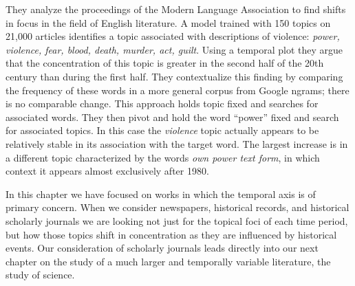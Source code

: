 They analyze the proceedings of the Modern Language Association to find shifts in focus in the field of English literature.
A model trained with 150 topics on 21,000 articles identifies a topic associated with descriptions of violence: {\em power,
violence, fear, blood, death, murder, act, guilt}. Using a temporal plot they argue that the concentration of this topic is greater in the second half of the 20th century than during the first half.
They contextualize this finding by comparing the frequency of these words in a more general corpus from Google ngrams; there is no comparable change.
This approach holds topic fixed and searches for associated words.
They then pivot and hold the word ``power'' fixed and search for associated topics.
In this case the {\em violence} topic actually appears to be relatively stable in its association with the target word. The largest increase is in a different topic characterized by the words {\em own power text form}, in which context it appears almost exclusively after 1980.

In this chapter we have focused on works in which the temporal axis is of primary concern.
When we consider newspapers, historical records, and historical scholarly journals we are looking not just for the topical foci of each time period, but how those topics shift in concentration as they are influenced by historical events.
Our consideration of scholarly journals leads directly into our next chapter on the study of a much larger and temporally variable literature, the study of science.